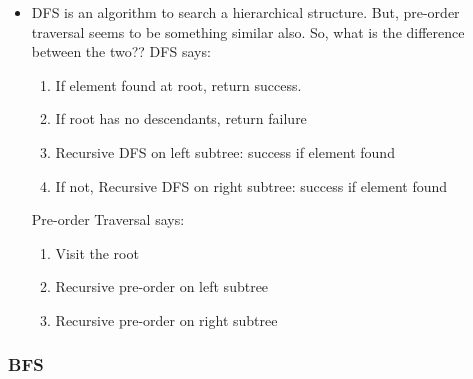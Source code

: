 \documentclass[a4paper,12pt,twoside]{book}
\begin{document}
\begin{itemize}
\item DFS is an algorithm to search a hierarchical structure. But, pre-order traversal seems to be something similar also. So, what is the difference between the two?? DFS says:
\begin{enumerate}
\item If element found at root, return success.
\item If root has no descendants, return failure
\item Recursive DFS on left subtree: success if element found
\item If not, Recursive DFS on right subtree: success if element found
\end{enumerate}
Pre-order Traversal says:
\begin{enumerate}
\item Visit the root
\item Recursive pre-order on left subtree
\item Recursive pre-order on right subtree
\end{enumerate}

\end{itemize}

\subsubsection{BFS}
\end{document}
